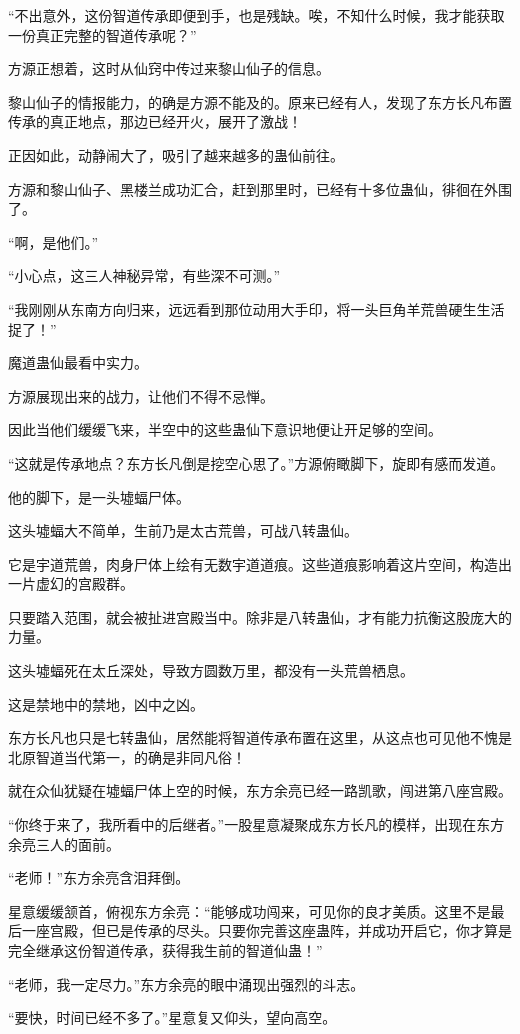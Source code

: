\begin{this_body}
“不出意外，这份智道传承即便到手，也是残缺。唉，不知什么时候，我才能获取一份真正完整的智道传承呢？”

方源正想着，这时从仙窍中传过来黎山仙子的信息。

黎山仙子的情报能力，的确是方源不能及的。原来已经有人，发现了东方长凡布置传承的真正地点，那边已经开火，展开了激战！

正因如此，动静闹大了，吸引了越来越多的蛊仙前往。

方源和黎山仙子、黑楼兰成功汇合，赶到那里时，已经有十多位蛊仙，徘徊在外围了。

“啊，是他们。”

“小心点，这三人神秘异常，有些深不可测。”

“我刚刚从东南方向归来，远远看到那位动用大手印，将一头巨角羊荒兽硬生生活捉了！”

魔道蛊仙最看中实力。

方源展现出来的战力，让他们不得不忌惮。

因此当他们缓缓飞来，半空中的这些蛊仙下意识地便让开足够的空间。

“这就是传承地点？东方长凡倒是挖空心思了。”方源俯瞰脚下，旋即有感而发道。

他的脚下，是一头墟蝠尸体。

这头墟蝠大不简单，生前乃是太古荒兽，可战八转蛊仙。

它是宇道荒兽，肉身尸体上绘有无数宇道道痕。这些道痕影响着这片空间，构造出一片虚幻的宫殿群。

只要踏入范围，就会被扯进宫殿当中。除非是八转蛊仙，才有能力抗衡这股庞大的力量。

这头墟蝠死在太丘深处，导致方圆数万里，都没有一头荒兽栖息。

这是禁地中的禁地，凶中之凶。

东方长凡也只是七转蛊仙，居然能将智道传承布置在这里，从这点也可见他不愧是北原智道当代第一，的确是非同凡俗！

就在众仙犹疑在墟蝠尸体上空的时候，东方余亮已经一路凯歌，闯进第八座宫殿。

“你终于来了，我所看中的后继者。”一股星意凝聚成东方长凡的模样，出现在东方余亮三人的面前。

“老师！”东方余亮含泪拜倒。

星意缓缓颔首，俯视东方余亮：“能够成功闯来，可见你的良才美质。这里不是最后一座宫殿，但已是传承的尽头。只要你完善这座蛊阵，并成功开启它，你才算是完全继承这份智道传承，获得我生前的智道仙蛊！”

“老师，我一定尽力。”东方余亮的眼中涌现出强烈的斗志。

“要快，时间已经不多了。”星意复又仰头，望向高空。

\end{this_body}

